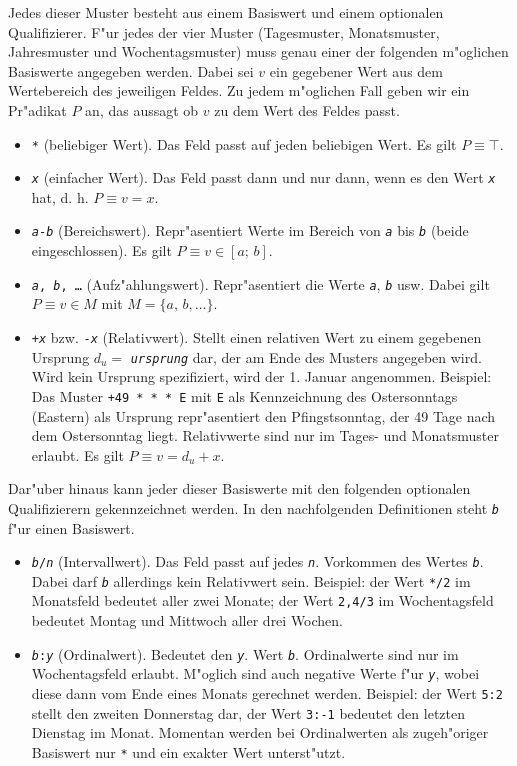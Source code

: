 \documentclass[a4paper]{article}
\numberwithin{equation}{section}
\begin{document}
Jedes dieser Muster besteht aus einem Basiswert und einem optionalen
Qualifizierer. F"ur jedes der vier Muster (Tagesmuster, Monatsmuster,
Jahresmuster und Wochentagsmuster) muss genau einer der folgenden m"oglichen
Basiswerte angegeben werden. Dabei sei $v$ ein gegebener Wert aus dem
Wertebereich des jeweiligen Feldes. Zu jedem m"oglichen Fall geben wir ein
Pr"adikat $P$ an, das aussagt ob $v$ zu dem Wert des Feldes passt.
\begin{itemize}
\item \texttt{*} (beliebiger Wert). Das Feld passt auf jeden beliebigen Wert. Es
  gilt $P \equiv \top$.
\item \texttt{\textit{x}} (einfacher Wert). Das Feld passt dann und nur dann,
  wenn es den Wert \texttt{\textit{x}} hat, d. h. $P \equiv v = x$.
\item \texttt{\textit{a}-\textit{b}} (Bereichswert). Repr"asentiert Werte im
  Bereich von \texttt{\textit{a}} bis \texttt{\textit{b}} (beide
  eingeschlossen). Es gilt $P \equiv v \in [a;\,b]$.
\item \texttt{\textit{a}, \textit{b}, \ldots} (Aufz"ahlungswert). Repr"asentiert
  die Werte \texttt{\textit{a}}, \texttt{\textit{b}} usw. Dabei gilt
  $P \equiv v \in M$ mit $M = \{a,\,b,\dots\}$.
\item \texttt{+\textit{x}} bzw. \texttt{-\textit{x}} (Relativwert). Stellt einen
  relativen Wert zu einem gegebenen Ursprung $d_u = $ \texttt{\textit{ursprung}}
  dar, der am Ende des Musters angegeben wird. Wird kein Ursprung spezifiziert,
  wird der 1. Januar angenommen. Beispiel: Das Muster \texttt{+49 * * * E} mit
  \texttt{E} als Kennzeichnung des Ostersonntags (Eastern) als Ursprung
  repr"asentiert den Pfingstsonntag, der 49 Tage nach dem Ostersonntag liegt.
  Relativwerte sind nur im Tages- und Monatsmuster erlaubt. Es gilt
  $P \equiv v = d_u + x$.
\end{itemize}

\noindent Dar"uber hinaus kann jeder dieser Basiswerte mit den folgenden
optionalen Qualifizierern gekennzeichnet werden. In den nachfolgenden
Definitionen steht \texttt{\textit{b}} f"ur einen Basiswert.
\begin{itemize}
\item \texttt{\textit{b}/\textit{n}} (Intervallwert). Das Feld passt auf jedes
  \texttt{\textit{n}}. Vorkommen des Wertes \texttt{\textit{b}}. Dabei darf
  \texttt{\textit{b}} allerdings kein Relativwert sein. Beispiel: der Wert
  \texttt{*/2} im Monatsfeld bedeutet aller zwei Monate; der Wert \texttt{2,4/3}
  im Wochentagsfeld bedeutet Montag und Mittwoch aller drei Wochen.
\item \texttt{\textit{b}:\textit{y}} (Ordinalwert). Bedeutet den
  \texttt{\textit{y}}. Wert \texttt{\textit{b}}. Ordinalwerte sind nur im
  Wochentagsfeld erlaubt. M"oglich sind auch negative Werte f"ur
  \texttt{\textit{y}}, wobei diese dann vom Ende eines Monats gerechnet werden.
  Beispiel: der Wert \texttt{5:2} stellt den zweiten Donnerstag dar, der Wert
  \texttt{3:-1} bedeutet den letzten Dienstag im Monat. Momentan werden bei
  Ordinalwerten als zugeh"origer Basiswert nur \texttt{*} und ein exakter Wert
  unterst"utzt.
\end{itemize}
\end{document}
